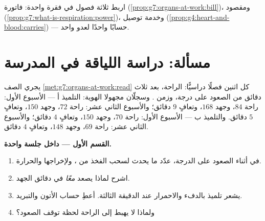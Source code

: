 \begin{exercise}[$\star\star\star$]\label{exo:g7:organs-at-work:12}
اربط ثلاثة فصول في فقرة واحدة: فاتورة 
(\cref{prop:g7:organs-at-work:bill})، ومقصود 
(\cref{prop:g7:what-is-respiration:power})، وخدمة توصيل 
(\cref{prop:g4:heart-and-blood:carries}) --- حسابًا واحدًا لعدو
واحد.
\end{exercise}

\section{مسألة: دراسة اللياقة في المدرسة}

\begin{problem}\label{pb:g7:organs-at-work:1}
يجري الصف \cref{met:g7:organs-at-work:read} كل اثنين فصلًا
دراسيًّا:  الراحة،  بعد ثلاث دقائق من الصعود على درجة، وزمن
. وسجلّان مجهولا الهوية: التلميذ أ --- الأسبوع الأول: راحة
$84$، وجهد $168$، وتعافٍ $9$ دقائق؛ والأسبوع الثاني عشر: راحة
$72$، وجهد $150$، وتعافٍ $5$ دقائق. والتلميذ ب --- الأسبوع الأول:
راحة $70$، وجهد $150$، وتعافٍ $4$ دقائق؛ والأسبوع الثاني عشر: راحة
$69$، وجهد $148$، وتعافٍ $4$ دقائق.

\medskip\noindent\textbf{القسم الأول --- داخل جلسة واحدة.}
\begin{enumerate}
  \item في أثناء الصعود على الدرجة، عدّد ما يحدث لسحب  الفخذ
        من  ، ولإخراجها 
        والحرارة.
  \item اشرح لماذا يصعد   \emph{معًا} في دقائق
        الجهد.
  \item يشعر تلميذ بالدفء والاحمرار عند الدقيقة الثالثة. أعطِ
        حساب الأتون والتبريد.
  \item ولماذا لا يهبط  إلى الراحة لحظة توقف الصعود؟
\end{enumerate}


\end{problem}

